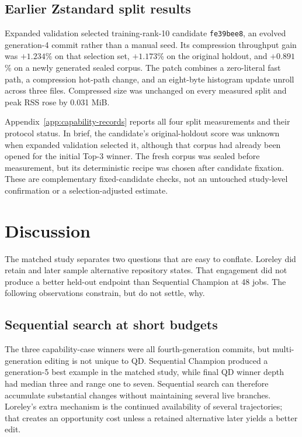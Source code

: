 \documentclass[10pt,twocolumn]{article}
\newcommand{\code}[1]{\texttt{#1}}
\begin{document}
\subsection{Earlier Zstandard split results}
\label{sec:zstd-results}

Expanded validation selected training-rank-10 candidate \code{fe39bee8}, an
evolved generation-4 commit rather than a manual seed. Its compression
throughput gain was $+1.234$\% on that selection set, $+1.173$\% on the
original holdout, and $+0.891$\% on a newly generated sealed corpus. The
patch combines a zero-literal fast path, a compression hot-path change, and an
eight-byte histogram update unroll across three files. Compressed size was
unchanged on every measured split and peak RSS rose by 0.031 MiB.

Appendix~\ref{app:capability-records} reports all four split measurements and
their protocol status. In brief, the candidate's original-holdout score was
unknown when expanded validation selected it, although that corpus had already
been opened for the initial Top-3 winner. The fresh corpus was sealed before
measurement, but its deterministic recipe was chosen after candidate fixation.
These are complementary fixed-candidate checks, not an untouched
study-level confirmation or a selection-adjusted estimate.

\section{Discussion}

The matched study separates two questions that are easy to conflate. Loreley
did retain and later sample alternative repository states. That engagement did not
produce a better held-out endpoint than Sequential Champion at 48 jobs. The
following observations constrain, but do not settle, why.

\subsection{Sequential search at short budgets}

The three capability-case winners were all fourth-generation commits, but
multi-generation editing is not unique to QD. Sequential Champion produced a
generation-5 best example in the matched study, while final QD winner depth had
median three and range one to seven. Sequential search can therefore accumulate
substantial changes without maintaining several live branches. Loreley's extra
mechanism is the continued availability of several trajectories; that creates
an opportunity cost unless a retained alternative later yields a better edit.
\end{document}
